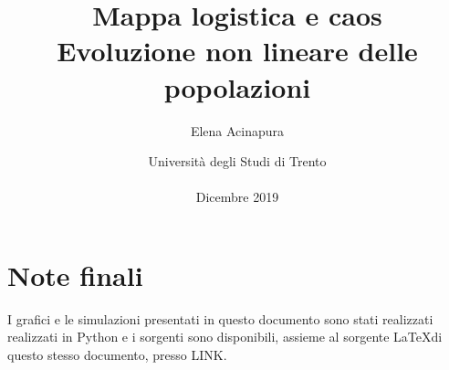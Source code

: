 \documentclass{article}
\title{\textbf{\LARGE Mappa logistica e caos}\\ {\Large Evoluzione non lineare delle popolazioni}}
\author{Elena Acinapura}
\date{Università degli Studi di Trento \\ \\ Dicembre 2019}
\theoremstyle{teorema}
\theoremstyle{definizione}
\begin{document}
\maketitle
\begin{minipage}{\linewidth}
\end{minipage}

\newpage
\tableofcontents
\newpage






\vspace{30pt}

\vspace{30pt}
\section*{Note finali}
I grafici e le simulazioni presentati in questo documento sono stati realizzati realizzati in Python e i sorgenti sono disponibili, assieme al sorgente \LaTeX di questo stesso documento, presso LINK.
\end{document}
